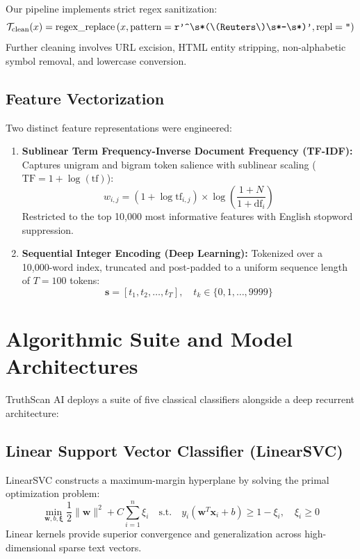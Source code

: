\documentclass[11pt,a4paper]{article}
\begin{document}
Our pipeline implements strict regex sanitization:
\begin{equation}
\mathcal{T}_{\text{clean}}(x) = \text{regex\_replace}\left(x, \text{pattern}=\text{\texttt{r'\textasciicircum\textbackslash s*(\textbackslash(Reuters\textbackslash)\textbackslash s*-\textbackslash s*)'}}, \text{repl}=\text{\texttt{''}}\right)
\end{equation}
Further cleaning involves URL excision, HTML entity stripping, non-alphabetic symbol removal, and lowercase conversion.

\subsection{Feature Vectorization}
Two distinct feature representations were engineered:
\begin{enumerate}[leftmargin=*]
    \item \textbf{Sublinear Term Frequency-Inverse Document Frequency (TF-IDF):}
    Captures unigram and bigram token salience with sublinear scaling ($\text{TF} = 1 + \log(\text{tf})$):
    \begin{equation}
    w_{i,j} = (1 + \log \text{tf}_{i,j}) \times \log\left(\frac{1 + N}{1 + \text{df}_i}\right)
    \end{equation}
    Restricted to the top 10,000 most informative features with English stopword suppression.
    
    \item \textbf{Sequential Integer Encoding (Deep Learning):}
    Tokenized over a 10,000-word index, truncated and post-padded to a uniform sequence length of $T = 100$ tokens:
    \begin{equation}
    \mathbf{s} = [t_1, t_2, \dots, t_T], \quad t_k \in \{0, 1, \dots, 9999\}
    \end{equation}
\end{enumerate}

\section{Algorithmic Suite and Model Architectures}

TruthScan AI deploys a suite of five classical classifiers alongside a deep recurrent architecture:

\subsection{Linear Support Vector Classifier (LinearSVC)}
LinearSVC constructs a maximum-margin hyperplane by solving the primal optimization problem:
\begin{equation}
\min_{\mathbf{w}, b, \boldsymbol{\xi}} \frac{1}{2} \|\mathbf{w}\|^2 + C \sum_{i=1}^n \xi_i \quad \text{s.t.} \quad y_i (\mathbf{w}^T \mathbf{x}_i + b) \geq 1 - \xi_i, \quad \xi_i \geq 0
\end{equation}
Linear kernels provide superior convergence and generalization across high-dimensional sparse text vectors.
\end{document}
